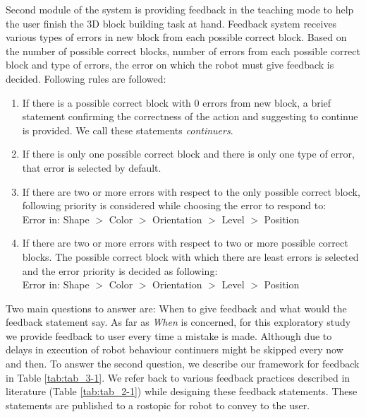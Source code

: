 Second module of the system is providing feedback in the teaching mode to help the user finish the 3D block building task at hand. Feedback system receives various types of errors in new block from each possible correct block. Based on the number of possible correct blocks, number of errors from each possible correct block and type of errors, the error on which the robot must give feedback is decided. Following rules are followed:
\begin{enumerate}
    \item If there is a possible correct block with 0 errors from new block, a brief statement confirming the correctness of the action and suggesting to continue is provided. We call these statements \emph{continuers}. 
    \item If there is only one possible correct block and there is only one type of error, that error is selected by default.
    \item If there are two or more errors with respect to the only possible correct block, following priority is considered while choosing the error to respond to:\\
    Error in: Shape $>$ Color $>$ Orientation $>$ Level $>$ Position
    \item If there are two or more errors with respect to two or more possible correct blocks. The possible correct block with which there are least errors is selected and the error priority is decided as following:\\
    Error in: Shape $>$ Color $>$ Orientation $>$ Level $>$ Position
\end{enumerate}
Two main questions to answer are: When to give feedback and what would the feedback statement say. As far as \emph{When} is concerned, for this exploratory study we provide feedback to user every time a mistake is made. Although due to delays in execution of robot behaviour continuers might be skipped every now and then. To answer the second question, we describe our framework for feedback in Table \ref{tab:tab_3-1}. We refer back to various feedback practices described in literature (Table \ref{tab:tab_2-1}) while designing these feedback statements. These statements are published to a rostopic for robot to convey to the user. 
